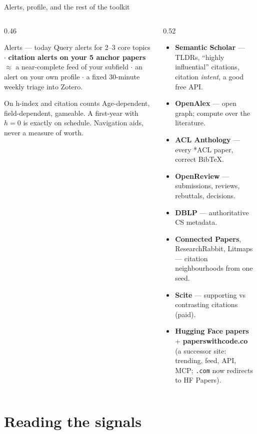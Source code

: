 \documentclass[aspectratio=169,11pt]{beamer}
\newcommand{\code}[1]{\texttt{\small #1}}
\newcommand{\key}[1]{\textbf{\color{brand}#1}}
\begin{document}
\begin{frame}{Alerts, profile, and the rest of the toolkit}
\begin{columns}[T]
\begin{column}{0.46\textwidth}
\begin{block}{Alerts --- today}
\footnotesize
Query alerts for 2--3 core topics $\cdot$ \key{citation alerts on your 5 anchor
papers} $\approx$ a near-complete feed of your subfield $\cdot$ an alert on
your own profile $\cdot$ a fixed 30-minute weekly triage into Zotero.
\end{block}
\begin{alertblock}{On h-index and citation counts}
\footnotesize
Age-dependent, field-dependent, gameable. A first-year with $h=0$ is exactly on
schedule. Navigation aids, never a measure of worth.
\end{alertblock}
\end{column}
\begin{column}{0.52\textwidth}
\footnotesize
\begin{itemize}
  \item \key{Semantic Scholar} --- TLDRs, ``highly influential'' citations,
        citation \emph{intent}, a good free API.
  \item \key{OpenAlex} --- open graph; compute over the literature.
  \item \key{ACL Anthology} --- every *ACL paper, correct BibTeX.
  \item \key{OpenReview} --- submissions, reviews, rebuttals, decisions.
  \item \key{DBLP} --- authoritative CS metadata.
  \item \key{Connected Papers}, ResearchRabbit, Litmaps --- citation
        neighbourhoods from one seed.
  \item \key{Scite} --- supporting vs contrasting citations (paid).
  \item \key{Hugging Face papers} + \key{paperswithcode.co} (a successor
        site: trending, feed, API, MCP; \code{.com} now redirects to HF Papers).
\end{itemize}
\end{column}
\end{columns}
\end{frame}

\section{Reading the signals}
\end{document}

